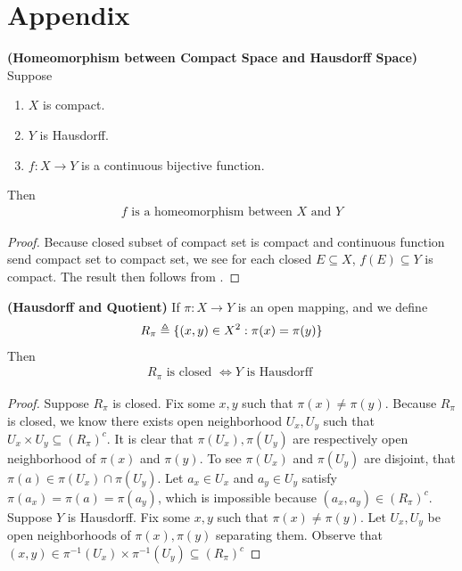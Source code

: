 \documentclass{report}
\begin{document}
\section{Appendix}
\begin{theorem}
\label{HbC}
\textbf{(Homeomorphism between Compact Space and Hausdorff Space)} Suppose 
\begin{enumerate}[label=(\alph*)]
  \item $X$ is compact.  
  \item $Y$ is Hausdorff.  
  \item $f:X\rightarrow Y$ is a continuous bijective function. 
\end{enumerate}
Then 
\begin{align*}
f\text{ is a homeomorphism between }X\text{ and }Y
\end{align*}
\end{theorem}
\begin{proof}
Because closed subset of compact set is compact and continuous function send compact set to compact set, we see for each closed $E\subseteq X$, $f(E)\subseteq Y$ is compact. The result then follows from . 
\end{proof}
\begin{theorem}
\label{Hausdorff and Quotient}
  \textbf{(Hausdorff and Quotient)} If $\pi:X\rightarrow Y$ is an open mapping, and we define
\begin{align*}
R_\pi\triangleq \{ (x,y)\in X^2 : \pi (x)=\pi (y) \} 
\end{align*}
Then
\begin{align*}
R_\pi\text{ is closed }\iff Y\text{ is Hausdorff }
\end{align*}
\end{theorem}
\begin{proof}
  Suppose $R_\pi$ is closed. Fix some $x,y$ such that $\pi (x)\neq \pi (y)$. Because $R_\pi$ is closed, we know there exists open neighborhood $U_x,U_y$ such that $U_x \times U_y \subseteq (R_\pi)^c$. It is clear that $\pi (U_x),\pi (U_y)$ are respectively open neighborhood of $\pi (x)$ and $\pi (y)$. To see $\pi (U_x)$ and $\pi (U_y)$ are disjoint,  that $\pi (a)\in \pi (U_x)\cap \pi (U_y)$. Let $a_x\in U_x$ and $a_y\in U_y$ satisfy $\pi (a_x)=\pi (a)=\pi (a_y)$, which is impossible because $(a_x,a_y)\in (R_\pi)^c$. \CaC\\


Suppose $Y$ is Hausdorff. Fix some  $x,y$ such that  $\pi (x)\neq \pi (y)$. Let $U_x,U_y$ be open neighborhoods of  $\pi (x),\pi (y)$ separating them. Observe that $(x,y)\in \pi^{-1}(U_x)\times \pi^{-1}(U_y)\subseteq (R_\pi)^c$
\end{proof}
\end{document}
